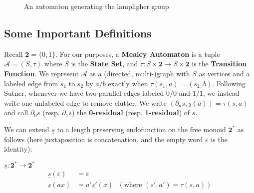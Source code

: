 \documentclass[runningheads]{llncs}
\newcommand{\A}{\mathcal{A}}
\newcommand{\2}{\textbf{2}}
\newcommand{\del}{\partial}
\begin{document}
\begin{figure}
\begin{center}
\end{center}

\caption{An automaton generating the lampligher group}
\label{fig:1}
\end{figure}

\subsection{Some Important Definitions}

Recall $\2 = \{0,1\}$. For our purposes, a \textbf{Mealey Automaton} is a 
tuple $\A = (S, \tau)$ where $S$ is the \textbf{State Set}, and 
$\tau : S \times \2 \to S \times \2$ is the \textbf{Transition Function}. 
We represent $\A$ as a (directed, multi-)graph with $S$ as vertices and a 
labeled edge from $s_1$ to $s_2$ by $a/b$ exactly when $\tau(s_1,a) = (s_2,b)$.
Following Sutner, whenever we have two parallel edges labeled $0/0$ and $1/1$,
we instead write one unlabeled edge to remove clutter.
We write $(\del_a s, \underline{s}(a)) = \tau(s,a)$ and call $\del_0 s$ 
(resp. $\del_1 s$) the \textbf{0-residual} (resp. \textbf{1-residual}) of $s$.

We can extend $\underline{s}$ to a length preserving endofunction on the 
free monoid $\2^*$ as follows (here juxtaposition is concatenation, 
and the empty word $\varepsilon$ is the identity):

$\underline{s} : \2^* \to \2^*$
\begin{align*}
  \underline{s}(\varepsilon) &= \varepsilon\\
  \underline{s}(ax)       &= a' \underline{s'}(x) 
  ~~~(\text{where } (s', a') = \tau(s,a))
\end{align*}
\end{document}
